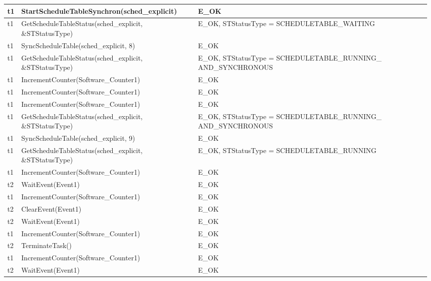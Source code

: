 \documentclass[10pt]{article}
\newlength{\Li}\settowidth{\Li}{Running}
\newlength{\Lii}\setlength{\Lii}{7cm}
\newlength{\Liiii}\setlength{\Liiii}{0.9cm}
\newlength{\Liii}\setlength{\Liii}{\textwidth} \addtolength{\Liii}{-\Li} \addtolength{\Liii}{-\Lii} \addtolength{\Liii}{-\Liiii}
\begin{document}
	\begin{supertabular}{|p{\Li}|p{\Lii}|p{\Liii}|p{\Liiii}|} \hline 
	t1		& StartScheduleTableSynchron(sched\_explicit)					& E\_OK																	& \\ \hline
	t1		& GetScheduleTableStatus(sched\_explicit, \&STStatusType)			& E\_OK, STStatusType = SCHEDULETABLE\_WAITING								& \\ \hline
	t1		& SyncScheduleTable(sched\_explicit, 8)							& E\_OK																	& \\ \hline
	t1		& GetScheduleTableStatus(sched\_explicit, \&STStatusType)			& E\_OK, STStatusType = SCHEDULETABLE\_RUNNING\_ AND\_SYNCHRONOUS		& \\ \hline
	t1		& IncrementCounter(Software\_Counter1)						& E\_OK																	& \\ \hline
	t1		& IncrementCounter(Software\_Counter1)						& E\_OK																	& \\ \hline
	t1		& IncrementCounter(Software\_Counter1)						& E\_OK																	& \\ \hline
	t1		& GetScheduleTableStatus(sched\_explicit, \&STStatusType)			& E\_OK, STStatusType = SCHEDULETABLE\_RUNNING\_ AND\_SYNCHRONOUS		& \\ \hline
	t1		& SyncScheduleTable(sched\_explicit, 9)							& E\_OK																	& \\ \hline
	t1		& GetScheduleTableStatus(sched\_explicit, \&STStatusType)			& E\_OK, STStatusType = SCHEDULETABLE\_RUNNING 							& \\ \hline
	t1		& IncrementCounter(Software\_Counter1)						& E\_OK																	& \\ \hline
	t2		& WaitEvent(Event1)											& E\_OK																	& \\ \hline
	t1		& IncrementCounter(Software\_Counter1)						& E\_OK																	& \\ \hline
	t2		& ClearEvent(Event1)										& E\_OK																	& \\ \hline
	t2		& WaitEvent(Event1)											& E\_OK																	& \\ \hline
	t1		& IncrementCounter(Software\_Counter1)						& E\_OK																	& \\ \hline
	t2		& TerminateTask()											& E\_OK																	& \\ \hline
	t1		& IncrementCounter(Software\_Counter1)						& E\_OK																	& \\ \hline
	t2		& WaitEvent(Event1)											& E\_OK																	& \\ \hline

\end{supertabular}
\end{document}
